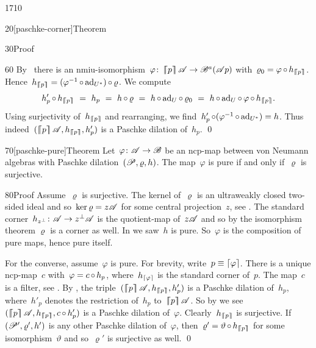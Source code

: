 \begin{parsec}{1710}
\begin{point}{20}[paschke-corner]{Theorem}
\begin{point}{30}{Proof}
\begin{point}{60}
    By~
    there is an nmiu-isomorphism~$\varphi\colon
    \left\lceil\!\!\left\lceil p\right\rceil\!\!\right\rceil \mathscr{A} \to \mathscr{B}^a(\mathscr{A} p)$
    with~$\varrho_0 = \varphi \mathop{\circ} h_{\left\lceil\!\!\left\lceil p\right\rceil\!\!\right\rceil}$.
Hence~$h_{\left\lceil\!\!\left\lceil p\right\rceil\!\!\right\rceil} = (\varphi^{-1} \mathop{\circ} \mathrm{ad}_{U^*}) \mathop{\circ} \varrho$.
We compute
\begin{equation*}
h'_p \after h_{\cceil{p}}
    \ = \ h_p
    \ =\  h \after \varrho
    \ =\ h \after \ad_U \after \varrho_0
    \ = \ h \after \ad_U \after \varphi \after h_{\cceil{p}}.
\end{equation*}
Using surjectivity of~$h_{\left\lceil\!\!\left\lceil p\right\rceil\!\!\right\rceil}$
and rearranging, we find~$h'_p \mathop{\circ} (\varphi^{-1} \mathop{\circ} \mathrm{ad}_{U^*}) = h$.
Thus indeed~$(\cceil{p} \scrA, h_{\cceil{p}}, h'_p)$
is a Paschke dilation of~$h_p$.  \qed
\end{point}
\end{point}
\end{point}
\begin{point}{70}[paschke-pure]{Theorem}%
    Let~$\varphi\colon \mathscr{A} \to \mathscr{B}$ be an ncp-map
    between von Neumann algebras with
    Paschke dilation~$(\mathscr{P}, \varrho, h)$.
The map~$\varphi$ is pure if and only if~$\varrho$ is surjective.
\begin{point}{80}{Proof}%
Assume~$\varrho$ is surjective.
The kernel of~$\varrho$ is an ultraweakly closed
two-sided ideal and so~$\ker\varrho = z \mathscr{A}$ for some central projection~$z$,
see .
The standard corner~$h_{z^\perp} \colon \mathscr{A} \to z^\perp \mathscr{A}$
    is the quotient-map of~$z \mathscr{A}$
    and so by the isomorphism theorem $\varrho$ is a corner as well.
In  we saw~$h$ is pure.
So~$\varphi$ is the composition of pure maps, hence pure itself.

For the converse, assume~$\varphi$ is pure.
For brevity, write~$p \equiv \left\lceil\varphi\right\rceil$.
There is a unique ncp-map~$c$ with~$\varphi = c \mathop{\circ} h_p$,
    where~$h_{\left\lceil\varphi\right\rceil}$ is the standard corner of~$p$.
The map~$c$ is a filter,
    see .
By ,
    the triple~$(\cceil{p}\scrA, h_{\cceil{p}}, h'_p)$
    is a Paschke dilation of~$h_p$,
    where~$h'_p$ denotes the restriction of~$h_p$ to~$\left\lceil\!\!\left\lceil p\right\rceil\!\!\right\rceil \mathscr{A}$.
So by 
    we see~$(\cceil{p}\scrA, h_{\cceil{p}}, c\after h'_p)$
    is a Paschke dilation of~$ \varphi$.
Clearly~$h_{\left\lceil\!\!\left\lceil p\right\rceil\!\!\right\rceil}$ is surjective.
If~$(\mathscr{P}', \varrho', h')$ is any other Paschke dilation of~$\varphi$,
    then~$\varrho' = \vartheta \mathop{\circ} h_{\left\lceil\!\!\left\lceil p\right\rceil\!\!\right\rceil}$
    for some isomorphism~$\vartheta$
    and so~$\varrho'$ is surjective as well. \qed
\end{point}
\end{point}
\end{parsec}

